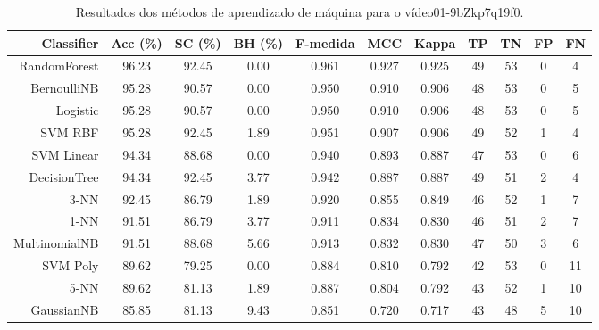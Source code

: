 \begin{table}[!htb]
\centering
\caption{Resultados dos métodos de aprendizado de máquina para o vídeo01-9bZkp7q19f0.}
\label{tab:01-9bZkp7q19f0}
\begin{tabular}{r|c|c|c|c|c|c|c|c|c|c}
\hline\hline
Classifier & Acc (\%) & SC (\%) & BH (\%) & F-medida & MCC & Kappa & TP & TN & FP & FN \\ \hline
RandomForest & 96.23 & 92.45 & 0.00 & 0.961 & 0.927 & 0.925 & 49 & 53 & 0 & 4 \\ 
BernoulliNB & 95.28 & 90.57 & 0.00 & 0.950 & 0.910 & 0.906 & 48 & 53 & 0 & 5 \\ 
Logistic & 95.28 & 90.57 & 0.00 & 0.950 & 0.910 & 0.906 & 48 & 53 & 0 & 5 \\ 
SVM RBF & 95.28 & 92.45 & 1.89 & 0.951 & 0.907 & 0.906 & 49 & 52 & 1 & 4 \\ 
SVM Linear & 94.34 & 88.68 & 0.00 & 0.940 & 0.893 & 0.887 & 47 & 53 & 0 & 6 \\ 
DecisionTree & 94.34 & 92.45 & 3.77 & 0.942 & 0.887 & 0.887 & 49 & 51 & 2 & 4 \\ 
3-NN & 92.45 & 86.79 & 1.89 & 0.920 & 0.855 & 0.849 & 46 & 52 & 1 & 7 \\ 
1-NN & 91.51 & 86.79 & 3.77 & 0.911 & 0.834 & 0.830 & 46 & 51 & 2 & 7 \\ 
MultinomialNB & 91.51 & 88.68 & 5.66 & 0.913 & 0.832 & 0.830 & 47 & 50 & 3 & 6 \\ 
SVM Poly & 89.62 & 79.25 & 0.00 & 0.884 & 0.810 & 0.792 & 42 & 53 & 0 & 11 \\ 
5-NN & 89.62 & 81.13 & 1.89 & 0.887 & 0.804 & 0.792 & 43 & 52 & 1 & 10 \\ 
GaussianNB & 85.85 & 81.13 & 9.43 & 0.851 & 0.720 & 0.717 & 43 & 48 & 5 & 10 \\ 
\hline\hline
\end{tabular}
\end{table}
